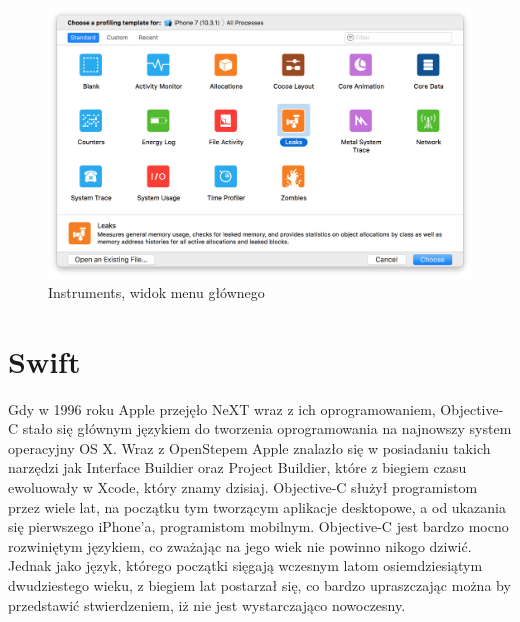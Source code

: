 \begin{figure}[ht!]
  \centering
  \includegraphics[width=120mm]{images/chapter-2-image-6-instruments.png}
  \caption{Instruments, widok menu głównego}
  \label{fig:instruments}
\end{figure}

\section{Swift}

Gdy w 1996 roku Apple przejęło NeXT wraz z ich oprogramowaniem, Objective-C stało się głównym językiem do tworzenia oprogramowania na najnowszy system operacyjny OS X. Wraz z OpenStepem Apple znalazło się w posiadaniu takich narzędzi jak Interface Buildier oraz Project Buildier, które z biegiem czasu ewoluowały w Xcode, który znamy dzisiaj. Objective-C służył programistom przez wiele lat, na początku tym tworzącym aplikacje desktopowe, a od ukazania się pierwszego iPhone'a, programistom mobilnym. Objective-C jest bardzo mocno rozwiniętym językiem, co zważając na jego wiek nie powinno nikogo dziwić. Jednak jako język, którego początki sięgają wczesnym latom osiemdziesiątym dwudziestego wieku, z biegiem lat postarzał się, co bardzo upraszczając można by przedstawić stwierdzeniem, iż nie jest wystarczająco nowoczesny.

